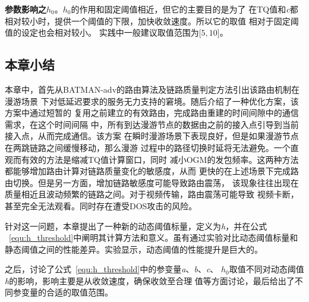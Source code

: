 \textbf{参数影响之$h_{0}$}。$h_{0}$的作用和固定阈值相近，但它的主要目的是为了
在TQ值和\emph{c}都相对较小时，提供一个阈值的下限，加快收敛速度。所以它的取值
相对于固定阈值的设定也会相对较小。
实践中一般建议取值范围为$\lbrack5,10\rbrack$。

\subsection{本章小结}
本章中，首先从BATMAN-adv的路由算法及链路质量判定方法引出该路由机制在漫游场景
下对低延迟要求的服务无力支持的窘境。随后介绍了一种优化方案，该方案中通过短暂的
复用之前建立的有效路由，完成路由重建的时间间隙中的通信需求，在这个时间间隔
中，所有到达漫游节点的数据由之前的接入点引导到当前接入点，从而完成通信。该方案
在瞬时漫游场景下表现良好，但是如果漫游节点在两跳链路之间缓慢移动，那么漫游
过程中的路径切换时延将无法避免。一个直观而有效的方法是缩减TQ值计算窗口，同时
减小OGM的发包频率。这两种方法都能够增加路由计算对链路质量变化的敏感度，从而
更快的在上述场景下完成路由切换。但是另一方面，增加链路敏感度可能导致路由震荡，
该现象往往出现在质量相近且波动频繁的链路之间。对于视频传输，路由震荡可能导致
视频卡断，甚至完全无法观看。同时存在遭受DOS攻击的风险。

针对这一问题，本章提出了一种新的动态阈值标量，定义为\emph{h}，并在公式
~\ref{equ:h_threshold}中阐明其计算方法和意义。虽有通过实验对比动态阈值标量和
静态阈值之间的性能差异。实验显示，动态阈值的性能提升是巨大的。

之后，讨论了公式~\ref{equ:h_threshold}中的参变量\emph{a}、\emph{b}、\emph{c}、
$h_{0}$取值不同对动态阈值\emph{h}的影响，影响主要是从收敛速度，确保收敛至合理
值等方面讨论，最后给出了不同参变量的合适的取值范围。

